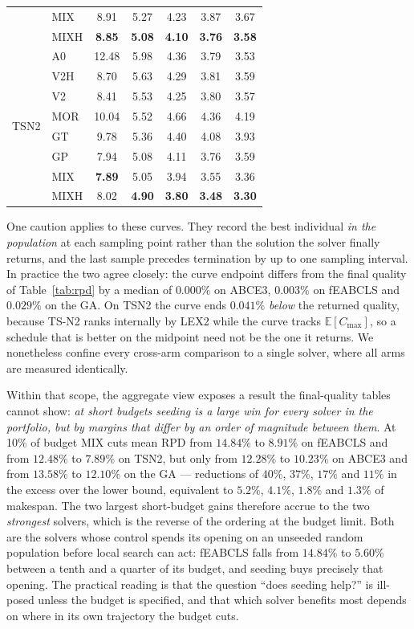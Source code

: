 \documentclass[review]{elsarticle}
\begin{document}
\begin{table}[htbp]
\begin{tabular}{llccccc}
 & MIX  & 8.91 & 5.27 & 4.23 & 3.87 & 3.67 \\
 & MIXH & \textbf{8.85} & \textbf{5.08} & \textbf{4.10} & \textbf{3.76} & \textbf{3.58} \\
\midrule
\multirow{8}{*}{TSN2}
 & A0   & 12.48 & 5.98 & 4.36 & 3.79 & 3.53 \\
 & V2H  & 8.70 & 5.63 & 4.29 & 3.81 & 3.59 \\
 & V2   & 8.41 & 5.53 & 4.25 & 3.80 & 3.57 \\
 & MOR  & 10.04 & 5.52 & 4.66 & 4.36 & 4.19 \\
 & GT   & 9.78 & 5.36 & 4.40 & 4.08 & 3.93 \\
 & GP   & 7.94 & 5.08 & 4.11 & 3.76 & 3.59 \\
 & MIX  & \textbf{7.89} & 5.05 & 3.94 & 3.55 & 3.36 \\
 & MIXH & 8.02 & \textbf{4.90} & \textbf{3.80} & \textbf{3.48} & \textbf{3.30} \\
\bottomrule
\end{tabular}
\end{table}

One caution applies to these curves. They record the best individual
\emph{in the population} at each sampling point rather than the solution
the solver finally returns, and the last sample precedes termination by up
to one sampling interval. In practice the two agree closely: the curve
endpoint differs from the final quality of Table~\ref{tab:rpd} by a median
of $0.000\%$ on ABCE3, $0.003\%$ on fEABCLS and $0.029\%$ on the GA. On
TSN2 the curve ends $0.041\%$ \emph{below} the returned quality, because
TS-N2 ranks internally by LEX2 while the curve tracks
$\mathbb{E}[C_{\max}]$, so a schedule that is better on the midpoint need
not be the one it returns. We nonetheless confine every cross-arm
comparison to a single solver, where all arms are measured identically.

Within that scope, the aggregate view exposes a result the final-quality
tables cannot show: \emph{at short budgets seeding is a large win for every
solver in the portfolio, but by margins that differ by an order of
magnitude between them}. At 10\% of budget MIX cuts mean RPD from
$14.84\%$ to $8.91\%$ on fEABCLS and from $12.48\%$ to $7.89\%$ on TSN2,
but only from $12.28\%$ to $10.23\%$ on ABCE3 and from $13.58\%$ to
$12.10\%$ on the GA --- reductions of $40\%$, $37\%$, $17\%$ and $11\%$ in
the excess over the lower bound, equivalent to $5.2\%$, $4.1\%$, $1.8\%$
and $1.3\%$ of makespan. The two largest short-budget gains therefore
accrue to the two \emph{strongest} solvers, which is the reverse of the
ordering at the budget limit. Both are the solvers whose control spends its
opening on an unseeded random population before local search can act:
fEABCLS falls from $14.84\%$ to $5.60\%$ between a tenth and a quarter of
its budget, and seeding buys precisely that opening. The practical reading
is that the question ``does seeding help?'' is ill-posed unless the budget
is specified, and that which solver benefits most depends on where in its
own trajectory the budget cuts.
\end{document}
